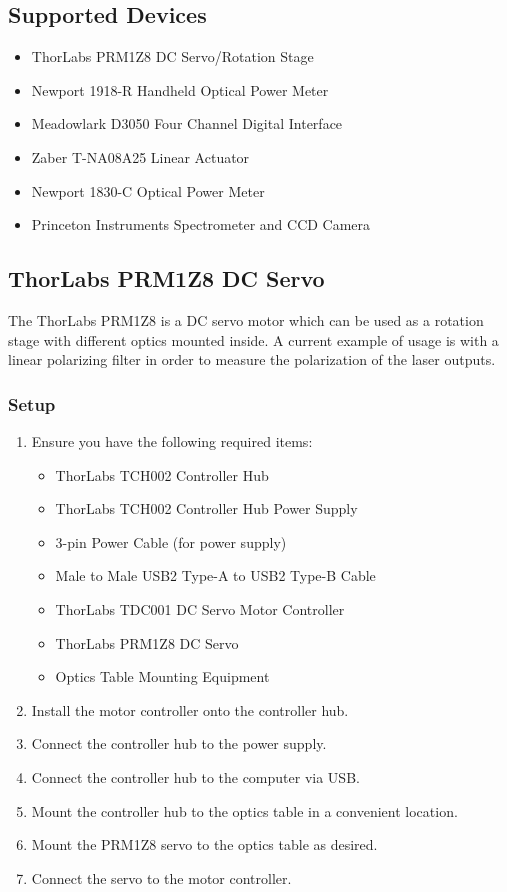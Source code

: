 \documentclass[11pt, letterpaper, titlepage]{article}
\begin{document}
\subsection{Supported Devices} %
\begin{itemize}
    \item ThorLabs PRM1Z8 DC Servo/Rotation Stage
    \item Newport 1918-R Handheld Optical Power Meter
    \item Meadowlark D3050 Four Channel Digital Interface
    \item Zaber T-NA08A25 Linear Actuator
    \item Newport 1830-C Optical Power Meter
    \item Princeton Instruments Spectrometer and CCD Camera
\end{itemize}
\subsection{ThorLabs PRM1Z8 DC Servo} %
The ThorLabs PRM1Z8 is a DC servo motor which can be used as a rotation stage with different optics mounted inside.
A current example of usage is with a linear polarizing filter in order to measure the polarization of the laser outputs.
\subsubsection{Setup} %
\begin{enumerate}
    \item Ensure you have the following required items:
    \begin{itemize}
        \item ThorLabs TCH002 Controller Hub
        \item ThorLabs TCH002 Controller Hub Power Supply
        \item 3-pin Power Cable (for power supply)
        \item Male to Male USB2 Type-A to USB2 Type-B Cable
        \item ThorLabs TDC001 DC Servo Motor Controller
        \item ThorLabs PRM1Z8 DC Servo
        \item Optics Table Mounting Equipment
    \end{itemize}
    \item Install the motor controller onto the controller hub.
    \item Connect the controller hub to the power supply.
    \item Connect the controller hub to the computer via USB.
    \item Mount the controller hub to the optics table in a convenient location.
    \item Mount the PRM1Z8 servo to the optics table as desired.
    \item Connect the servo to the motor controller.
\end{enumerate}
\end{document}
